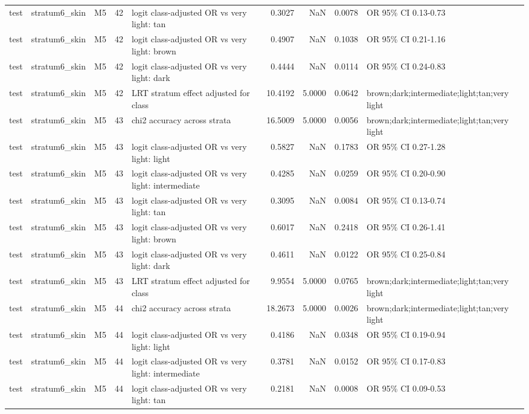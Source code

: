 \begin{tabular}{lllrlrrrl}
test & stratum6\_skin & M5 & 42 & logit class-adjusted OR vs very light: tan & 0.3027 & NaN & 0.0078 & OR 95\% CI 0.13-0.73 \\
test & stratum6\_skin & M5 & 42 & logit class-adjusted OR vs very light: brown & 0.4907 & NaN & 0.1038 & OR 95\% CI 0.21-1.16 \\
test & stratum6\_skin & M5 & 42 & logit class-adjusted OR vs very light: dark & 0.4444 & NaN & 0.0114 & OR 95\% CI 0.24-0.83 \\
test & stratum6\_skin & M5 & 42 & LRT stratum effect adjusted for class & 10.4192 & 5.0000 & 0.0642 & brown;dark;intermediate;light;tan;very light \\
test & stratum6\_skin & M5 & 43 & chi2 accuracy across strata & 16.5009 & 5.0000 & 0.0056 & brown;dark;intermediate;light;tan;very light \\
test & stratum6\_skin & M5 & 43 & logit class-adjusted OR vs very light: light & 0.5827 & NaN & 0.1783 & OR 95\% CI 0.27-1.28 \\
test & stratum6\_skin & M5 & 43 & logit class-adjusted OR vs very light: intermediate & 0.4285 & NaN & 0.0259 & OR 95\% CI 0.20-0.90 \\
test & stratum6\_skin & M5 & 43 & logit class-adjusted OR vs very light: tan & 0.3095 & NaN & 0.0084 & OR 95\% CI 0.13-0.74 \\
test & stratum6\_skin & M5 & 43 & logit class-adjusted OR vs very light: brown & 0.6017 & NaN & 0.2418 & OR 95\% CI 0.26-1.41 \\
test & stratum6\_skin & M5 & 43 & logit class-adjusted OR vs very light: dark & 0.4611 & NaN & 0.0122 & OR 95\% CI 0.25-0.84 \\
test & stratum6\_skin & M5 & 43 & LRT stratum effect adjusted for class & 9.9554 & 5.0000 & 0.0765 & brown;dark;intermediate;light;tan;very light \\
test & stratum6\_skin & M5 & 44 & chi2 accuracy across strata & 18.2673 & 5.0000 & 0.0026 & brown;dark;intermediate;light;tan;very light \\
test & stratum6\_skin & M5 & 44 & logit class-adjusted OR vs very light: light & 0.4186 & NaN & 0.0348 & OR 95\% CI 0.19-0.94 \\
test & stratum6\_skin & M5 & 44 & logit class-adjusted OR vs very light: intermediate & 0.3781 & NaN & 0.0152 & OR 95\% CI 0.17-0.83 \\
test & stratum6\_skin & M5 & 44 & logit class-adjusted OR vs very light: tan & 0.2181 & NaN & 0.0008 & OR 95\% CI 0.09-0.53 \\

\end{tabular}

